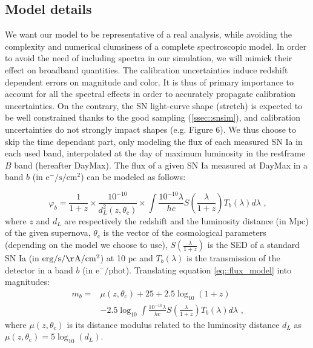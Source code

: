 \documentclass[\docopts]{\docclass}
\begin{document}
\subsection{Model details}
\label{subsec::model_details}
We want our model to be representative of a real analysis, while avoiding the complexity and numerical clumsiness of a complete spectroscopic model.
In order to avoid the need of including spectra in our simulation, we will mimick their effect on broadband quantities.
The calibration uncertainties induce redshift dependent errors on magnitude and color.
It is thus of primary importance to account for all the spectral effects in order to accurately propagate calibration uncertainties.
On the contrary, the SN light-curve shape (stretch) is expected to be well constrained thanks to the good sampling (\ref{ssec::snsim}), and calibration uncertainties do not strongly impact shapes (e.g. \cite{1401.4064} Figure 6).
We thus choose to skip the time dependant part, only modeling the flux of each measured SN Ia in each used band, interpolated at the day of maximum luminosity in the restframe $B$ band (hereafter DayMax).
The flux of a given SN Ia measured at DayMax in a band $b$ (in $\mathrm{e^{-}/s/cm^2}$) can be modeled as follows:

\begin{equation}
\label{eq::flux_model}
\varphi_b = \frac{1}{1+z} \times \frac{10^{-10}}{d_L^2(z, \theta_\text{c})}\times \int \frac{10^{-10}\lambda}{hc} S\left(\frac{\lambda}{1+z}\right) T_b(\lambda) d\lambda \text{ ,}
\end{equation}
where $z$ and $d_L$ are respectively the redshift and the luminosity distance (in $\mathrm{Mpc}$) of the given supernova,
$\theta_\text{c}$ is the vector of the cosmological parameters (depending on the model we choose to use),
$S\left(\frac{\lambda}{1+z}\right)$ is the SED of a standard SN Ia (in $\mathrm{erg/s/\AA/cm^2}$) at 10 $\mathrm{pc}$ and $T_b(\lambda)$ is the transmission of the detector in a band $b$ (in $\mathrm{e^-/phot}$).
Translating equation \ref{eq::flux_model} into magnitudes:
\begin{equation}
\begin{split}
\label{eq::raw_model}
m_b = &\mu(z, \theta_\text{c}) + 25 + 2.5\log_{10}(1+z) \\
&- 2.5\log_{10}\int \frac{10^{-10}\lambda}{hc} S\left(\frac{\lambda}{1+z}\right) T_b(\lambda) d\lambda \text{ ,}
\end{split}
\end{equation}
where $\mu(z, \theta_\text{c})$ is its distance modulus related to the luminosity distance $d_L$ as $\mu(z, \theta_\text{c}) = 5\log_{10}(d_L)$.
\end{document}
